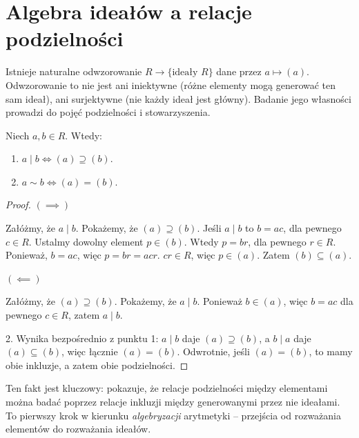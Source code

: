 \section{Algebra ideałów a relacje podzielności}

\begin{remark}
Istnieje naturalne odwzorowanie $R \longrightarrow \{\text{ideały } R\}$ dane przez $a \mapsto (a)$. Odwzorowanie to nie jest ani iniektywne (różne elementy mogą generować ten sam ideał), ani surjektywne (nie każdy ideał jest główny). Badanie jego własności prowadzi do pojęć podzielności i stowarzyszenia.
\end{remark}

\begin{fact}
Niech $a,b \in R$. Wtedy:
\begin{enumerate}[label=\arabic*)]
    \item $a \mid b \iff (a) \supseteq (b)$.
    \item $a \sim b \iff (a) = (b)$.
\end{enumerate}
\end{fact}

\begin{proof}
\noindent
\noindent $\left( \implies \right) $

Załóżmy, że $a\mid b$. Pokażemy, że $\left( a \right) \supseteq \left( b \right) $. Jeśli $a\mid b$ to $b = ac$, dla pewnego  $c \in R$. Ustalmy dowolny element $p \in \left( b \right)$. Wtedy $p = br$, dla pewnego  $r\in R$. Ponieważ, $b = ac$, więc  $p = br = acr$.  $cr \in R$, więc $p \in \left( a \right) $. Zatem $\left( b \right) \subseteq \left( a \right) $.

\noindent $\left( \impliedby \right) $ 

Załóżmy, że $\left( a \right) \supseteq \left( b \right) $. Pokażemy, że $a\mid b$. Ponieważ $b\in \left( a \right) $, więc $b = ac$ dla pewnego $c\in R$, zatem $a\mid b$.

2. Wynika bezpośrednio z punktu 1: $a \mid b$ daje $(a) \supseteq (b)$, a $b \mid a$ daje $(a) \subseteq (b)$, więc łącznie $(a) = (b)$. Odwrotnie, jeśli $(a) = (b)$, to mamy obie inkluzje, a zatem obie podzielności.
\end{proof}

\begin{intuition}
Ten fakt jest kluczowy: pokazuje, że relacje podzielności między elementami można badać poprzez relacje inkluzji między generowanymi przez nie ideałami. To pierwszy krok w kierunku \emph{algebryzacji} arytmetyki – przejścia od rozważania elementów do rozważania ideałów.
\end{intuition}


